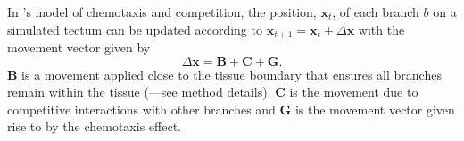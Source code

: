 \documentclass[9pt,lineno,draft]{elife}
\begin{document}
In \citet{simpson_simple_2011}'s model of chemotaxis and competition, the position, $\mathbf{x}_t$, of each branch $b$ on a simulated tectum can be updated according to $\mathbf{x}_{t+1} = \mathbf{x}_{t} + \Delta \mathbf{x}$ with the movement vector given by
\begin{equation} \label{e:dX}
 \Delta \mathbf{x} = \mathbf{B} + \mathbf{C} + \mathbf{G}.
\end{equation}
$\mathbf{B}$ is a movement applied close to the tissue boundary that ensures all branches remain within the tissue (\citet{holt_target_1998}---see method details).
%
%
$\mathbf{C}$ is the movement due to competitive interactions with other branches
%
and $\mathbf{G}$ is the movement vector given rise to by the chemotaxis effect.


%




\end{document}
